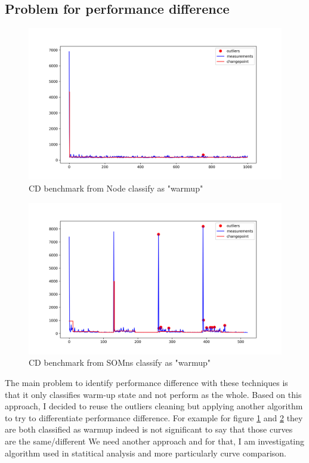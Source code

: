 \documentclass{article}
\begin{document}
\subsection{Problem for performance difference}

\begin{figure}[h!]
    \centering
    \includegraphics[width=1\textwidth]{images/plot_6_flat.png}
    \caption{CD benchmark from Node classify as "warmup" }
    \label{fig:bench_node_flat}
\end{figure}



\begin{figure}[h!]
    \centering
    \includegraphics[width=1\textwidth]{images/plot_10_flat.png}
    \caption{CD benchmark from SOMns classify as "warmup"}
    \label{fig:bench_somns_flat}
\end{figure}


The main problem to identify performance difference with these techniques is that it only classifies warm-up state and not perform as the whole. Based on this approach, I decided to reuse the outliers cleaning but applying another algorithm to try to differentiate performance difference. For example for figure \ref{fig:bench_node_flat} and \ref{fig:bench_somns_flat} they are both classified as warmup indeed is not significant to say that those curves are the same/different We need another approach and for that, I am investigating algorithm used in statitical analysis and more particularly curve comparison.
\end{document}

